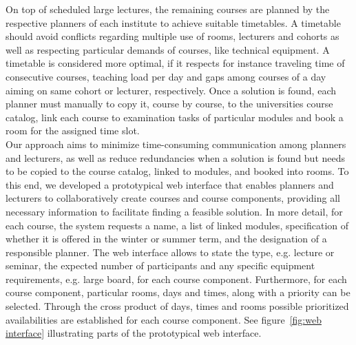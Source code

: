\documentclass{easychair}
\begin{document}
  On top of scheduled large lectures, the remaining courses are planned by the respective planners of each institute to achieve suitable timetables. 
  A timetable should avoid conflicts regarding multiple use of rooms, lecturers and cohorts as well as respecting particular demands of courses, like technical equipment.
  A timetable is considered more optimal, if it respects for instance traveling time of consecutive courses, teaching load per day and gaps among courses of a day aiming on same cohort or lecturer, respectively. 
  Once a solution is found, each planner must manually to copy it, course by course, to the universities course catalog, link each course to examination tasks of particular modules and book a room for the assigned time slot. \\
  Our approach aims to minimize time-consuming communication among planners and lecturers, as well as reduce redundancies when a solution is found but needs to be copied to the course catalog, linked to modules, and booked into rooms.
  To this end, we developed a prototypical web interface that enables planners and lecturers to collaboratively create courses and course components, providing all necessary information to facilitate finding a feasible solution.
  In more detail, for each course, the system requests a name, a list of linked modules, specification of whether it is offered in the winter or summer term, and the designation of a responsible planner.
  The web interface allows to state the type, e.g. lecture or seminar, the expected number of participants and any specific equipment requirements, e.g. large board, for each course component.  
  Furthermore, for each course component, particular rooms, days and times, along with a priority can be selected.
  Through  the cross product of days, times and rooms possible prioritized availabilities are established for each course component. 
  See figure~\ref{fig:web interface} illustrating parts of the prototypical web interface. 
\end{document}
